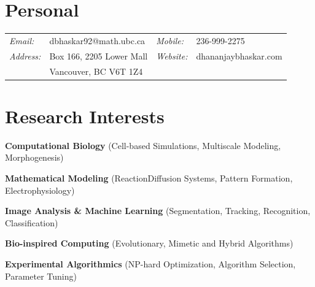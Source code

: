\documentclass[margin,line]{res}
\newenvironment{list4}{
  \begin{list}{\ding{113}}{
      \setlength{\itemsep}{0in}
      \setlength{\parsep}{0in} \setlength{\parskip}{0in}
      \setlength{\topsep}{0in} \setlength{\partopsep}{0in} 
      \setlength{\leftmargin}{0.0in}}}{\end{list}}
\begin{document}
\pagestyle{plain}

\vspace*{.1cm}
 

\begin{resume}

\vspace*{.2cm}

\section{\sc Personal}
\begin{tabular}{@{}p{1.4cm}p{6.7cm}p{2.1cm}p{4cm}}
{\it Email:}& dbhaskar92@math.ubc.ca &  {\it Mobile:}& 236-999-2275  \\
{\it Address:}& Box 166, 2205 Lower Mall & {\it Website:}& dhananjaybhaskar.com \\
& Vancouver, BC V6T 1Z4 & & \\
\end{tabular}

\vspace*{.2cm}

\section{\sc Research Interests}
\begin{list4}
\item[]{\bf Computational Biology} (Cell-based Simulations, Multiscale Modeling, Morphogenesis)
\vspace*{.1cm}
\item[]{\bf Mathematical Modeling} (Reaction{\textendash}Diffusion Systems, Pattern Formation, Electrophysiology)
\vspace*{.1cm}
\item[]{\bf Image Analysis \& Machine Learning} (Segmentation, Tracking, Recognition, Classification)
\vspace*{.1cm}
\item[]{\bf Bio-inspired Computing} (Evolutionary, Mimetic and Hybrid Algorithms)
\vspace*{.1cm}
\item[]{\bf Experimental Algorithmics} (NP-hard Optimization, Algorithm Selection, Parameter Tuning) 
\end{list4}

\vspace*{.3cm}


\end{resume}
\end{document}

